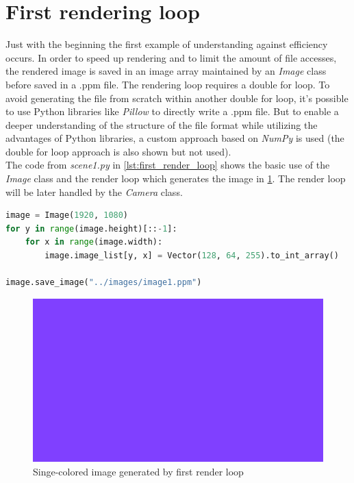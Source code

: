 \documentclass[]{article}
\begin{document}
	\section{First rendering loop}
	Just with the beginning the first example of understanding against efficiency occurs. In order to speed up rendering and to limit the amount of file accesses, the rendered image is saved in an image array maintained by an \emph{Image} class before saved in a .ppm file. The rendering loop requires a double for loop. To avoid generating the file from scratch within another double for loop, it’s possible to use Python libraries like \emph{Pillow} to directly write a .ppm file. But to enable a deeper understanding of the structure of the file format while utilizing the advantages of Python libraries, a custom approach based on \emph{NumPy} is used (the double for loop approach is also shown but not used).
	\\
	The code from \emph{scene1.py} in \cref{lst:first_render_loop} shows the basic use of the \emph{Image} class and the render loop which generates the image in \cref{fig:image1}. The render loop will be later handled by the \emph{Camera} class.
	
	\begin{lstlisting}[caption={Example for a basic render loop}, language=Python, label=lst:first_render_loop]
image = Image(1920, 1080)
for y in range(image.height)[::-1]:
	for x in range(image.width):
		image.image_list[y, x] = Vector(128, 64, 255).to_int_array()

image.save_image("../images/image1.ppm")
	\end{lstlisting}

	\begin{figure}[h]
		\centering
		\includegraphics[width=0.75\linewidth]{image1}
		\caption{Singe-colored image generated by first render loop}
		\label{fig:image1}
	\end{figure}
\end{document}
